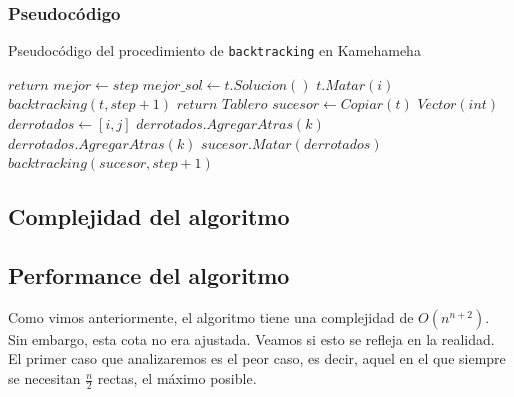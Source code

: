 \subsubsection{Pseudocódigo}
  \begin{algorithm}[H]
  \begin{algorithmic}
  \caption{Pseudocódigo del procedimiento de \texttt{backtracking} en Kamehameha}
      \State $return$
    \EndIf
      \State $mejor \gets step$
      \State $mejor\_sol \gets t.Solucion()$
    \Else
      \For {$i \in [0,..., n),$ $t.EstaVivo?(i)$}
          \State $t.Matar(i)$
          \State $backtracking(t, step+1)$
          \State $return$
        \EndIf
        \For {$j \in [0,..., n),$ $j \neq i \land t.EstaVivo?(j)$}
          \State $Tablero$ $sucesor \gets Copiar(t)$
          \State $Vector(int)$ $derrotados \gets [i, j]$ 
          \For {$k \in [0,..., n),$ $k \neq i \land k \neq j \land t.EstaVivo?(k)$}
                \State $derrotados.AgregarAtras(k)$
              \EndIf
            \Else 
                \State $derrotados.AgregarAtras(k)$
              \EndIf
            \EndIf
          \EndFor
          \State $sucesor.Matar(derrotados)$
          \State $backtracking(sucesor, step+1)$
        \EndFor
      \EndFor
    \EndIf
    \EndProcedure
  \end{algorithmic}
  \end{algorithm}

\subsection{Complejidad del algoritmo}

\subsection{Performance del algoritmo}

Como vimos anteriormente, el algoritmo tiene una complejidad de $O(n^{n+2})$. Sin embargo, esta cota no era ajustada. Veamos si esto se refleja en la realidad. El primer caso que analizaremos es el peor caso, es decir, aquel en el que siempre se necesitan $\frac{n}{2}$ rectas, el máximo posible.

